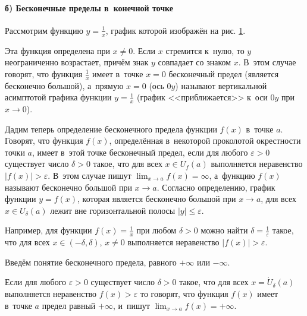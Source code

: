 \paragraph{б) Бесконечные пределы в~конечной точке}\label{sec:4_1_3_b}
Рассмотрим функцию $\displaystyle y = \frac{1}{x}$,
график которой изображён на рис. \ref{fig:4_1_3_5}.

\begin{figure}\label{fig:4_1_3_5}
\end{figure}

\noindent
Эта функция определена при $x \ne 0$. Если $x$ стремится к~нулю, то $y$ неограниченно
возрастает, причём знак $y$ совпадает со знаком $x$. В~этом случае говорят,
что функция $\displaystyle \frac{1}{x}$ имеет в~точке $x = 0$ бесконечный предел
(является бесконечно большой), а~прямую $x = 0$ (ось $0y$) называют вертикальной
асимптотой графика функции $\displaystyle y = \frac{1}{x}$
(график <<приближается>> к~оси $0y$ при $x \to 0$).

Дадим теперь определение бесконечного предела функции $f(x)$ в~точке $a$.
Говорят, что функция $f(x)$, определённая в~некоторой проколотой окрестности
точки $a$, имеет в~этой точке бесконечный предел, если для любого $\varepsilon > 0$
существует число $\delta > 0$ такое, что для всех $x \in U_{f}(a)$
выполняется неравенство $\left| f(x) \right| > \varepsilon$.
В~этом случае пишут $\displaystyle \lim_{x \to a} f(x) = \infty$,
а~функцию $f(x)$ называют бесконечно большой при $x \to a$.
Согласно определению, график функции $y = f(x)$, которая является
бесконечно большой при $x \to a$, для всех $x \in U_{\delta}(a)$ лежит
вне горизонтальной полосы $|y| \leqslant \varepsilon$.

Например, для функции $\displaystyle f(x) = \frac{1}{x}$ при любом $\delta > 0$
можно найти $\displaystyle \delta = \frac{1}{\varepsilon}$ такое, что для всех
$x \in (-\delta, \delta)$, $x \ne 0$ выполняется неравенство
$\left| f(x) \right| > \varepsilon$.

Введём понятие бесконечного предела, равного $+\infty$ или $-\infty$.

Если для любого $\varepsilon > 0$ существует число $\delta > 0$ такое,
что для всех $x = \dot U_{\delta}(a)$ выполняется неравенство
$f(x) > \varepsilon$ то говорят, что функция $f(x)$ имеет в~точке $a$
предел равный $+\infty$, и~пишут $\displaystyle \lim_{x  \to a} f(x) = +\infty$.

\begin{figure}\label{fig:4_1_3_6}
\end{figure}

